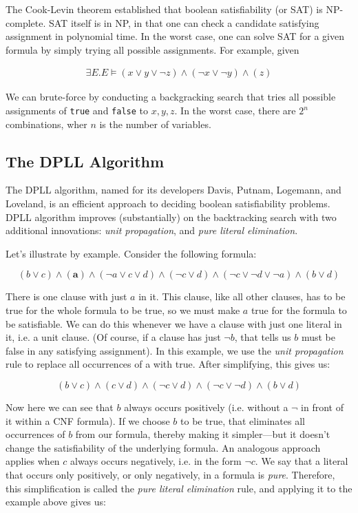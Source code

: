 \documentclass[11pt]{article}
\begin{document}
The Cook-Levin theorem established that boolean satisfiability (or SAT) is
NP-complete. SAT itself is in NP, in that one can check a candidate satisfying
assignment in polynomial time.  In the worst case, one can solve SAT for a given
formula by simply trying all possible assignments.  For example, given 

\[
\begin{array}{c}
\exists E . E \vDash (x \lor y \lor \lnot z) \land (\lnot x \lor \lnot y) \land (z)
\end{array}
\]

We can brute-force by conducting a backgracking search that tries all possible
assignments of \texttt{true} and \texttt{false} to $x, y, z$. In the worst case,
there are $2^n$ combinations, wher $n$ is the number of variables.

\subsection{The DPLL Algorithm}

The DPLL algorithm, named for its developers Davis, Putnam, Logemann, and
Loveland, is an efficient approach to deciding boolean satisfiability problems.
DPLL algorithm improves (substantially) on the backtracking search with two
additional innovations: \emph{unit propagation}, and \emph{pure literal
  elimination}.  

Let's illustrate by example. Consider the following formula:

\[
(b \lor c) \land (\mathbf{a}) \land (\lnot a \lor c \lor d) \land (\lnot c \lor d) \land (\lnot c \lor \lnot d \lor \lnot a) \land (b \lor d)
\]

There is one clause with just $a$ in it. This clause, like all other clauses,
has to be true for the whole formula to be true, so we must make $a$ true for
the formula to be satisfiable. We can do this whenever we have a clause with
just one literal in it, i.e. a unit clause. (Of course, if a clause has just
$\lnot b$, that tells us $b$ must be false in any satisfying assignment). In
this example, we use the \textit{unit propagation} rule to replace all
occurrences of a with true. After simplifying, this gives us:

\[
(b \lor c) \land (c \lor d) \land (\lnot c \lor d) \land (\lnot c \lor \lnot d) \land (b \lor d)
\]

Now here we can see that $b$ always occurs positively (i.e. without a $\lnot$ in
front of it within a CNF formula). If we choose $b$ to be true, that eliminates
all occurrences of $b$ from our formula, thereby making it simpler---but it
doesn't change the satisfiability of the underlying formula. An analogous
approach applies when $c$ always occurs negatively, i.e. in the form $\lnot c$.
We say that a literal that occurs only positively, or only negatively, in a
formula is \textit{pure}. Therefore, this simplification is called the
\textit{pure literal elimination} rule, and applying it to the example above
gives us:
\end{document}
